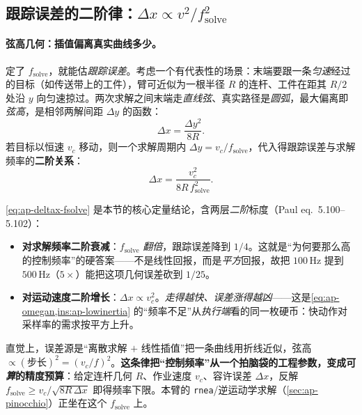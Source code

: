 \subsection{跟踪误差的二阶律：$\Delta x\propto v^2/f_{\mathrm{solve}}^2$}
\label{sec:ap-deltax-law}

\paragraph{弦高几何：插值偏离真实曲线多少。}
定了 $f_{\mathrm{solve}}$，就能估\emph{跟踪误差}。考虑一个有代表性的场景：末端要跟一条\emph{匀速}经过的目标（如传送带上的工件），臂可近似为一根半径 $R$ 的连杆、工件在距其 $R/2$ 处沿 $y$ 向匀速掠过。两次求解之间末端走\emph{直线弦}、真实路径是\emph{圆弧}，最大偏离即\emph{弦高}，是相邻两解间距 $\Delta y$ 的函数：
\begin{equation}
  \Delta x = \frac{\Delta y^{2}}{8R}.
  \label{eq:ap-deltax-chord}
\end{equation}
若目标以恒速 $v_c$ 移动，则一个求解周期内 $\Delta y=v_c/f_{\mathrm{solve}}$，代入得跟踪误差与求解频率的\textbf{二阶关系}：
\begin{equation}
  \boxed{\;\Delta x = \frac{v_c^{2}}{8R\,f_{\mathrm{solve}}^{2}}.\;}
  \label{eq:ap-deltax-fsolve}
\end{equation}

\begin{insight}\label{ins:ap-deltax-law}
\cref{eq:ap-deltax-fsolve} 是本节的核心定量结论，含两层\emph{二阶}标度（Paul eq.\ 5.100--5.102\cite{paul1981robot}）：
\begin{itemize}
  \item \textbf{对求解频率二阶衰减}：$f_{\mathrm{solve}}$ \emph{翻倍}，跟踪误差降到 $1/4$。这就是“为何要那么高的控制频率”的硬答案——不是线性回报，而是\emph{平方}回报，故把 $100\,\mathrm{Hz}$ 提到 $500\,\mathrm{Hz}$（$5\times$）能把这项几何误差砍到 $1/25$。
  \item \textbf{对运动速度二阶增长}：$\Delta x\propto v_c^2$。\emph{走得越快、误差涨得越凶}——这是\cref{eq:ap-omegan,ins:ap-lowinertia} 的“频率不足”从\emph{执行端}看的同一枚硬币：快动作对采样率的需求按平方上升。
\end{itemize}
直觉上，误差源是“离散求解 $+$ 线性插值”把一条曲线用折线近似，弦高 $\propto(\text{步长})^2=(v_c/f)^2$。\textbf{这条律把“控制频率”从一个拍脑袋的工程参数，变成可\emph{算}的精度预算}：给定连杆几何 $R$、作业速度 $v_c$、容许误差 $\Delta x$，反解 $f_{\mathrm{solve}}\ge v_c/\sqrt{8R\,\Delta x}$ 即得频率下限。本臂的 \texttt{rnea}/逆运动学求解（\cref{sec:ap-pinocchio}）正坐在这个 $f_{\mathrm{solve}}$ 上。
\end{insight}

